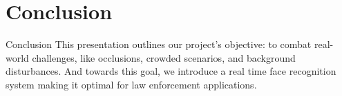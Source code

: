 \section{Conclusion}

\begin{frame}{Conclusion}
	This presentation outlines our project's objective: to combat real-world challenges, like occlusions, crowded scenarios, and background disturbances. And towards this goal, we introduce a real time face recognition system making it optimal for law enforcement applications.
\end{frame}